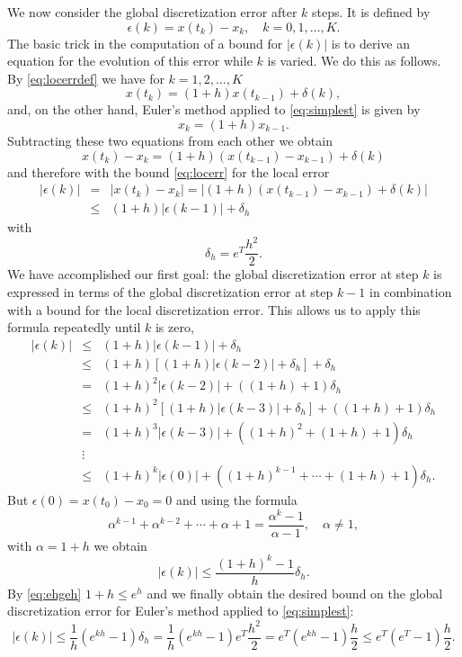 \documentclass{ximera}
\begin{document}
We now consider the global discretization error after $k$ steps.
It is defined by 
\[
\epsilon(k) = x(t_k) - x_k,\quad k=0,1,\ldots,K.
\]
The basic trick in the computation of a bound for $|\epsilon(k)|$
is to derive an equation for the evolution of this
error while $k$ is varied.  We do this as follows.  
By \eqref{eq:locerrdef} we have for $k=1,2,\ldots,K$
\[
x(t_k)=(1+h)x(t_{k-1})+\delta(k), 
\]
and, on the other hand, Euler's method applied to
\eqref{eq:simplest} is given by 
\[
x_k = (1+h)x_{k-1}.
\]
Subtracting these two equations from each other we obtain
\[
x(t_k) - x_k = (1+h)(x(t_{k-1})-x_{k-1})+\delta(k)
\]
and therefore with the bound \eqref{eq:locerr} for the local error
\begin{eqnarray*}
|\epsilon(k)| & = & |x(t_k) - x_k| =
|(1+h)(x(t_{k-1})-x_{k-1})+\delta(k)|\\ 
& \le & (1+h)|\epsilon(k-1)|+\delta_h
\end{eqnarray*}
with 
\begin{equation} \label{eq:euldh}
\delta_h = e^T\frac{h^2}{2}.
\end{equation}
We have accomplished our first goal: the global 
discretization error 
at step $k$ is expressed
in terms of the global discretization error at step $k-1$ in 
combination with a bound for the local discretization error.  
This allows us to apply this formula repeatedly until $k$ is zero,
\begin{equation} \label{eq:globest}
\begin{array}{rcl}
|\epsilon(k)|&\le&(1+h)|\epsilon(k-1)|+\delta_h\\
&\le& (1+h)[(1+h)|\epsilon(k-2)|+\delta_h]+\delta_h\\ 
&=& (1+h)^2|\epsilon(k-2)| + ((1+h) + 1)\delta_h\\
&\le& (1+h)^2[(1+h)|\epsilon(k-3)|+\delta_h] + ((1+h) + 1)\delta_h\\
&=& (1+h)^3|\epsilon(k-3)| + ((1+h)^2 + (1+h) + 1)\delta_h\\
&\vdots& \\
&\le & (1+h)^k|\epsilon(0)| + ((1+h)^{k-1} +\cdots + (1+h) + 1)\delta_h.
\end{array}
\end{equation}
But $\epsilon(0)=x(t_0) - x_0=0$ and using the formula
\[
\alpha^{k-1} + \alpha^{k-2} +\cdots + \alpha + 1=
\frac{\alpha^k -1}{\alpha-1},\quad \alpha \not=1,
\]
with $\alpha = 1+h$ we obtain
\[
|\epsilon(k)| \le \frac{(1+h)^k -1}{h}\delta_h.
\]
By \eqref{eq:ehgeh} $1+h\le e^h$ and we finally
obtain the desired bound on the global 
discretization error
for Euler's method applied to \eqref{eq:simplest}:
\begin{equation} \label{eq:globerr}
|\epsilon(k)| \le \frac{1}{h} (e^{kh}-1)\delta_h=
\frac{1}{h}(e^{kh}-1)e^T\frac{h^2}{2} = e^T(e^{kh}-1)\frac{h}{2}
\le e^T(e^T-1)\frac{h}{2}.
\end{equation}
\end{document}

